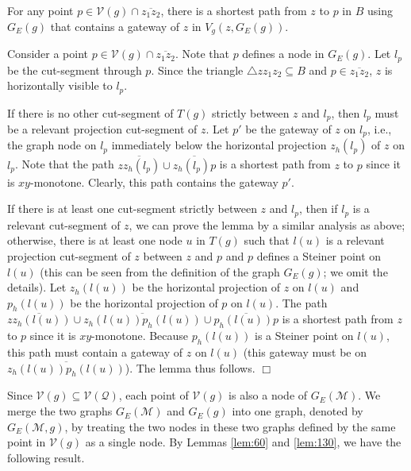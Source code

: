 \documentclass[english,runningheads,11pt]{llncs}
\def\calM{\mathcal{M}}
\def\calQ{\mathcal{Q}}
\def\calV{\mathcal{V}}
\newenvironment{proof}{\noindent {\textbf{Proof:}}\rm}{\hfill $\Box$\rm}
\begin{document}
\begin{lemma}\label{lem:130}
For any point $p\in \calV(g)\cap \overline{z_1z_2}$,
there is a shortest path from $z$ to
$p$ in $B$ using $G_E(g)$ that contains a gateway of $z$ in $V_g(z,G_E(g))$.
\end{lemma}
\begin{proof}
Consider a point $p\in \calV(g)\cap \overline{z_1z_2}$. Note that
$p$ defines a node in $G_E(g)$. Let $l_p$ be the cut-segment
through $p$. Since the triangle $\triangle zz_1z_2\subseteq B$ and
$p\in \overline{z_1z_2}$, $z$ is horizontally visible to $l_p$.

If there is no other cut-segment of $T(g)$ strictly
between $z$ and $l_p$, then $l_p$ must be a relevant projection
cut-segment of $z$. Let $p'$ be the gateway of $z$ on $l_p$, i.e., the
graph node on $l_p$ immediately below the horizontal
projection $z_h(l_p)$ of $z$ on $l_p$.
Note that the path
$\overline{zz_h(l_p)}\cup \overline{z_h(l_p)p}$ is a shortest path from $z$
to $p$ since it is $xy$-monotone. Clearly, this path contains
the gateway $p'$.

If there is at least one cut-segment strictly between $z$ and $l_p$,
then if $l_p$ is a relevant cut-segment of $z$, we can prove the
lemma by a similar analysis as above; otherwise,
there is at least one node $u$ in $T(g)$ such that
$l(u)$ is a relevant projection cut-segment of $z$ between $z$ and $p$
and $p$ defines a Steiner point on $l(u)$ (this can be seen
from the definition of the graph $G_E(g)$; we omit the
details). Let $z_h(l(u))$ be the horizontal projection
of $z$ on $l(u)$ and $p_h(l(u))$ be the horizontal projection
of $p$ on $l(u)$. The path
$\overline{zz_h(l(u))}\cup\overline{z_h(l(u))p_h(l(u))}\cup
\overline{p_h(l(u))p}$ is a
shortest path from $z$ to $p$ since it is $xy$-monotone. Because
$p_h(l(u))$ is a Steiner point on $l(u)$, this
path must contain a gateway of $z$ on $l(u)$ (this gateway must be
on $\overline{z_h(l(u))p_h(l(u))}$).
The lemma thus follows.
\end{proof}

Since $\calV(g)\subseteq \calV(\calQ)$, each
point of $\calV(g)$ is also a node of $G_E(\calM)$. We merge
the two graphs $G_E(\calM)$ and $G_E(g)$ into one graph, denoted by $G_E(\calM,g)$,
by treating the two nodes in these two graphs
defined by the same point in $\calV(g)$ as a single node.
By Lemmas \ref{lem:60} and
\ref{lem:130}, we have the following result.
\end{document}
